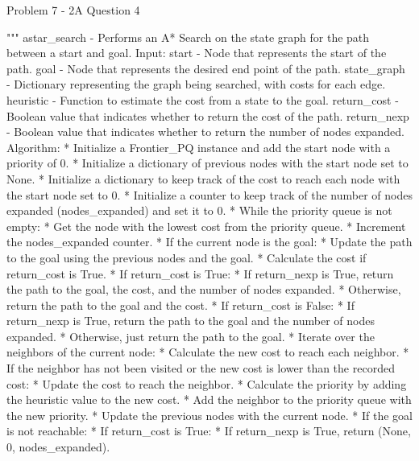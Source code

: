 \begin{problem}{Problem 7 - 2A Question 4}
\begin{highlight}[Solution]
\begin{code}[Python]
    """ astar_search - Performs an A* Search on the state graph for the path between a start and goal.
        Input:
            start - Node that represents the start of the path.
            goal - Node that represents the desired end point of the path.
            state_graph - Dictionary representing the graph being searched, with costs for each edge.
            heuristic - Function to estimate the cost from a state to the goal.
            return_cost - Boolean value that indicates whether to return the cost of the path.
            return_nexp - Boolean value that indicates whether to return the number of nodes expanded.
        Algorithm:
            * Initialize a Frontier_PQ instance and add the start node with a priority of 0.
            * Initialize a dictionary of previous nodes with the start node set to None.
            * Initialize a dictionary to keep track of the cost to reach each node with the start node set to 0.
            * Initialize a counter to keep track of the number of nodes expanded (nodes_expanded) and set it to 0.
            * While the priority queue is not empty:
                * Get the node with the lowest cost from the priority queue.
                * Increment the nodes_expanded counter.
                * If the current node is the goal:
                    * Update the path to the goal using the previous nodes and the goal.
                    * Calculate the cost if return_cost is True.
                    * If return_cost is True:
                        * If return_nexp is True, return the path to the goal, the cost, and the number of nodes expanded.
                        * Otherwise, return the path to the goal and the cost.
                    * If return_cost is False:
                        * If return_nexp is True, return the path to the goal and the number of nodes expanded.
                        * Otherwise, just return the path to the goal.
                * Iterate over the neighbors of the current node:
                    * Calculate the new cost to reach each neighbor.
                    * If the neighbor has not been visited or the new cost is lower than the recorded cost:
                        * Update the cost to reach the neighbor.
                        * Calculate the priority by adding the heuristic value to the new cost.
                        * Add the neighbor to the priority queue with the new priority.
                        * Update the previous nodes with the current node.
            * If the goal is not reachable:
                * If return_cost is True:
                    * If return_nexp is True, return (None, 0, nodes_expanded).

\end{code}
\end{highlight}
\end{problem}
